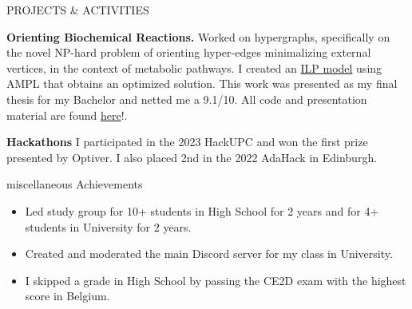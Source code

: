\documentclass{resume} %
\begin{document}
\begin{rSection}{PROJECTS \& ACTIVITIES}
    \vspace{-1.25em}
    \item \textbf{Orienting Biochemical Reactions.} {
            Worked on hypergraphs, specifically on the novel NP-hard problem of orienting hyper-edges minimalizing external vertices, in the context of metabolic pathways. 
            I created an \href{https://en.wikipedia.org/wiki/Integer_programming}{ILP model} using AMPL that obtains an optimized solution. 
            This work was presented as my final thesis for my Bachelor and netted me a 9.1/10. All code and presentation material are found \href{https://github.com/ZephyrSV/tfg_python}{here}!.
        }
    \item \textbf{Hackathons} {
        I participated in the 2023 HackUPC and won the first prize presented by Optiver.
        I also placed 2nd in the 2022 AdaHack in Edinburgh.
    }
\end{rSection} 

\begin{rSection}{miscellaneous Achievements}
    \begin{itemize}
        \itemsep -3pt {}
        \item 	Led study group for 10+ students in High School for 2 years and for 4+ students in University for 2 years.
        \item   Created and moderated the main Discord server for my class in University. 
        \item	I skipped a grade in High School by passing the CE2D exam with the highest score in Belgium.
    \end{itemize}
\end{rSection}
\end{document}
